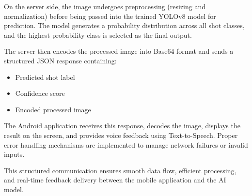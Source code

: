 On the server side, the image undergoes preprocessing (resizing and normalization) before being passed into the trained YOLOv8 model for prediction. The model generates a probability distribution across all shot classes, and the highest probability class is selected as the final output.

The server then encodes the processed image into Base64 format and sends a structured JSON response containing:
\begin{itemize}
	\item Predicted shot label
	\item Confidence score
	\item Encoded processed image
\end{itemize}

The Android application receives this response, decodes the image, displays the result on the screen, and provides voice feedback using Text-to-Speech. Proper error handling mechanisms are implemented to manage network failures or invalid inputs.

This structured communication ensures smooth data flow, efficient processing, and real-time feedback delivery between the mobile application and the AI model.
